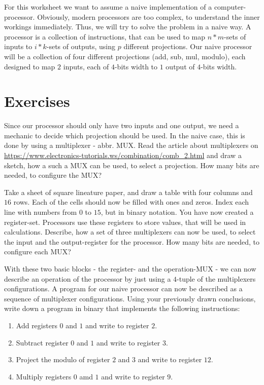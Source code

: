 \documentclass{dcbl/challenge}
\begin{document}
For this worksheet we want to assume a naive implementation of a computer-processor. 
Obviously, modern processors are too complex, to understand the inner workings immediately.
Thus, we will try to solve the problem in a naive way.
A processor is a collection of instructions, that can be used to map $n*m$-sets of inputs to $i*k$-sets of outputs, using $p$ different projections. 
Our naive processor will be a collection of four different projections (add, sub, mul, modulo), each designed to map $2$ inputs, each of $4$-bits width to $1$ output of $4$-bits width. 

\section*{Exercises}
\begin{aufgabe}
    Since our processor should only have two inputs and one output, we need a mechanic to decide which projection should be used. In the naive case, this is done by using a multiplexer - abbr. MUX. Read the article about multiplexers on \url{https://www.electronics-tutorials.ws/combination/comb_2.html} and draw a sketch, how a such a MUX can be used, to select a projection. How many bits are needed, to configure the MUX?
\end{aufgabe}

\begin{aufgabe}
    Take a sheet of square lineature paper, and draw a table with four columns and $16$ rows.
    Each of the cells should now be filled with ones and zeros. 
    Index each line with numbers from $0$ to $15$, but in binary notation. 
    You have now created a register-set. 
    Processors use these registers to store values, that will be used in calculations. 
    Describe, how a set of three multiplexers can now be used, to select the input and the output-register for the processor.
    How many bits are needed, to configure each MUX?
\end{aufgabe}

\begin{aufgabe}
    With these two basic blocks - the register- and the operation-MUX - we can now describe an operation of the processor by just using a $4$-tuple of the multiplexers configurations. 
    A program for our naive processor can now be described as a sequence of multiplexer configurations. 
    Using your previously drawn conclusions, write down a program in binary that implements the following instructions:
    \begin{enumerate}
        \item Add registers $0$ and $1$ and write to register $2$.
        \item Subtract register $0$ and $1$ and write to register $3$.
        \item Project the modulo of register $2$ and $3$ and write to register $12$.
        \item Multiply registers $0$ amd $1$ and write to register $9$.
    \end{enumerate}
\end{aufgabe}
\end{document}
